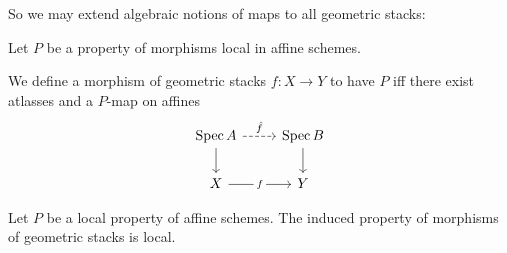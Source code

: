 \documentclass{article}
\begin{document}
So we may extend algebraic notions of maps to all geometric stacks:
\begin{definition}
	Let $P$ be a property of morphisms local in affine schemes.
	
	 We define a morphism of geometric stacks $f : X \to Y$ to have $P$ iff
	there exist atlasses and a $P$-map on affines 
	\[\begin{tikzcd}
		{\Spec A} & {\Spec B} \\
		X & Y
		\arrow["{\hat f}", dashed, from=1-1, to=1-2]
		\arrow[from=1-1, to=2-1]
		\arrow[from=1-2, to=2-2]
		\arrow["f"{description}, from=2-1, to=2-2]
	\end{tikzcd}\]
\end{definition}
\begin{lemma}
	Let $P$  be a local property of affine schemes. The induced property of morphisms of geometric stacks is local.
\end{lemma}
\end{document}
